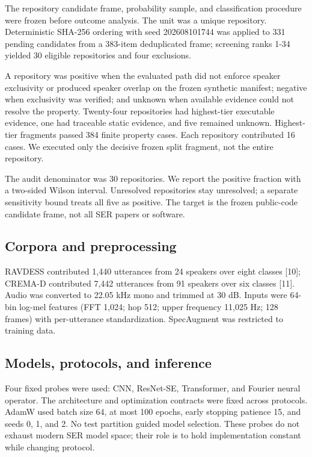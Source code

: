 \documentclass{article}
\begin{document}
The repository candidate frame, probability sample, and classification procedure were frozen before outcome analysis.
The unit was a unique repository.
Deterministic SHA-256 ordering with seed 202608101744 was applied to 331 pending candidates from a 383-item deduplicated frame; screening ranks 1-34 yielded 30 eligible repositories and four exclusions.

A repository was positive when the evaluated path did not enforce speaker exclusivity or produced speaker overlap on the frozen synthetic manifest; negative when exclusivity was verified; and unknown when available evidence could not resolve the property.
Twenty-four repositories had highest-tier executable evidence, one had traceable static evidence, and five remained unknown.
Highest-tier fragments passed 384 finite property cases.
Each repository contributed 16 cases.
We executed only the decisive frozen split fragment, not the entire repository.

The audit denominator was 30 repositories.
We report the positive fraction with a two-sided Wilson interval.
Unresolved repositories stay unresolved; a separate sensitivity bound treats all five as positive.
The target is the frozen public-code candidate frame, not all SER papers or software.

\subsection{Corpora and preprocessing}

RAVDESS contributed 1,440 utterances from 24 speakers over eight classes [10]; CREMA-D contributed 7,442 utterances from 91 speakers over six classes [11].
Audio was converted to 22.05 kHz mono and trimmed at 30 dB.
Inputs were 64-bin log-mel features (FFT 1,024; hop 512; upper frequency 11,025 Hz; 128 frames) with per-utterance standardization.
SpecAugment was restricted to training data.

\subsection{Models, protocols, and inference}

Four fixed probes were used: CNN, ResNet-SE, Transformer, and Fourier neural operator.
The architecture and optimization contracts were fixed across protocols.
AdamW used batch size 64, at most 100 epochs, early stopping patience 15, and seeds 0, 1, and 2.
No test partition guided model selection.
These probes do not exhaust modern SER model space; their role is to hold implementation constant while changing protocol.
\end{document}
